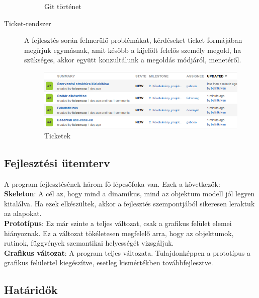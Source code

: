 \begin{description}
\begin{figure}[h]
\begin{center}
\caption{Git történet}
\label{fig:git}
\vspace{-20pt}
\end{center}
\end{figure}
\item[Ticket-rendszer] A fejlesztés során felmerülő problémákat, kérdéseket ticket formájában megírjuk egymásnak, amit később a kijelölt felelős személy megold, ha szükséges, akkor együtt konzultálunk a megoldás módjáról, menetéről.
\begin{figure}[h]
\begin{center}
\includegraphics[width=16.7cm]{chapters/chapter02/ticket.png}
\caption{Ticketek}
\label{fig:ticket}
\vspace{-20pt}
\end{center}
\end{figure}
\end{description}

\subsection{Fejlesztési ütemterv}

A program fejlesztésének három fő lépcsőfoka van. Ezek a következők:\\
\textbf{Skeleton}: A cél az, hogy mind a dinamikus, mind az objektum modell jól legyen kitalálva. Ha ezek elkészültek, akkor a fejlesztés szempontjából sikeresen leraktuk az alapokat.\\
\textbf{Prototípus}: Ez már szinte a teljes változat, csak a grafikus felület elemei hiányoznak. Ez a változat tökéletesen megfelelő arra, hogy az objektumok, rutinok, függvények szemantikai helyességét vizsgáljuk.\\
\textbf{Grafikus változat}: A program teljes változata. Tulajdonképpen a prototípus a grafikus felülettel kiegészítve, esetleg kismértékben továbbfejlesztve.

\subsection{Határidők}

